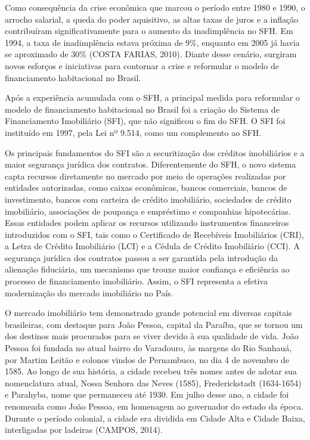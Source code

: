 \documentclass[
  12pt,
  a4paper,
]{scrreprt}
\begin{document}
\vspace{12pt}

Como consequência da crise econômica que marcou o período entre 1980 e
1990, o arrocho salarial, a queda do poder aquisitivo, as altas taxas de
juros e a inflação contribuíram significativamente para o aumento da
inadimplência no SFH. Em 1994, a taxa de inadimplência estava próxima de
9\%, enquanto em 2005 já havia se aproximado de 30\% (COSTA FARIAS,
2010). Diante desse cenário, surgiram novos esforços e iniciativas para
contornar a crise e reformular o modelo de financiamento habitacional no
Brasil.

\vspace{12pt}

Após a experiência acumulada com o SFH, a principal medida para
reformular o modelo de financiamento habitacional no Brasil foi a
criação do Sistema de Financiamento Imobiliário (SFI), que não
significou o fim do SFH. O SFI foi instituído em 1997, pela Lei nº
9.514, como um complemento ao SFH.

\vspace{12pt}

Os principais fundamentos do SFI são a securitização dos créditos
imobiliários e a maior segurança jurídica dos contratos. Diferentemente
do SFH, o novo sistema capta recursos diretamente no mercado por meio de
operações realizadas por entidades autorizadas, como caixas econômicas,
bancos comerciais, bancos de investimento, bancos com carteira de
crédito imobiliário, sociedades de crédito imobiliário, associações de
poupança e empréstimo e companhias hipotecárias. Essas entidades podem
aplicar os recursos utilizando instrumentos financeiros introduzidos com
o SFI, tais como o Certificado de Recebíveis Imobiliários (CRI), a Letra
de Crédito Imobiliário (LCI) e a Cédula de Crédito Imobiliário (CCI). A
segurança jurídica dos contratos passou a ser garantida pela introdução
da alienação fiduciária, um mecanismo que trouxe maior confiança e
eficiência ao processo de financiamento imobiliário. Assim, o SFI
representa a efetiva modernização do mercado imobiliário no País.

\vspace{12pt}

O mercado imobiliário tem demonstrado grande potencial em diversas
capitais brasileiras, com destaque para João Pessoa, capital da Paraíba,
que se tornou um dos destinos mais procurados para se viver devido à sua
qualidade de vida. João Pessoa foi fundada no atual bairro do Varadouro,
às margens do Rio Sanhauá, por Martim Leitão e colonos vindos de
Pernambuco, no dia 4 de novembro de 1585. Ao longo de sua história, a
cidade recebeu três nomes antes de adotar sua nomenclatura atual, Nossa
Senhora das Neves (1585), Frederickstadt (1634-1654) e Parahyba, nome
que permaneceu até 1930. Em julho desse ano, a cidade foi renomeada como
João Pessoa, em homenagem ao governador do estado da época. Durante o
período colonial, a cidade era dividida em Cidade Alta e Cidade Baixa,
interligadas por ladeiras (CAMPOS, 2014).
\end{document}

